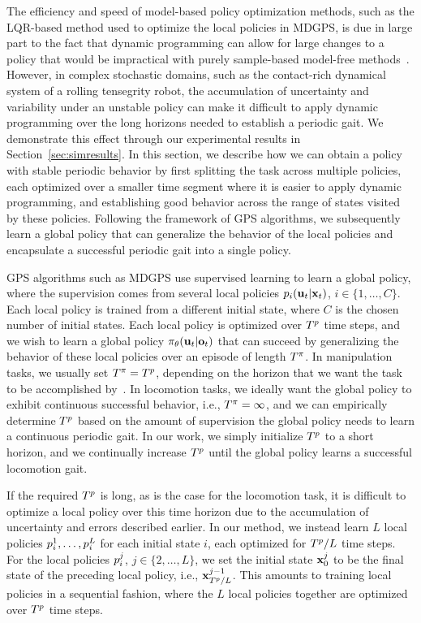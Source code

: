 The efficiency and speed of model-based policy optimization methods, such as the
LQR-based method used to optimize the local policies in MDGPS, is due in large
part to the fact that dynamic programming can allow for large changes to a
policy that would be impractical with purely sample-based model-free
methods~\cite{la-lnnpg-14}. However, in complex stochastic domains, such as the
contact-rich dynamical system of a rolling tensegrity robot, the accumulation of
uncertainty and variability under an unstable policy can make it difficult to
apply dynamic programming over the long horizons needed to establish a periodic
gait. We demonstrate this effect through our experimental results in
Section~\ref{sec:simresults}. In this section, we describe how we can obtain a
policy with stable periodic behavior by first splitting the task across multiple
policies, each optimized over a smaller time segment where it is easier to apply
dynamic programming, and establishing good behavior across the range of states
visited by these policies. Following the framework of GPS algorithms, we
subsequently learn a global policy that can generalize the behavior of the local
policies and encapsulate a successful periodic gait into a single policy.

GPS algorithms such as MDGPS use supervised learning to learn a global policy,
where the supervision comes from several local policies $p_i(\mathbf{u}_t|\mathbf{x}_t)$,
$i\in\{1,\ldots,C\}$. Each local policy is trained from a different initial
state, where $C$ is the chosen number of initial states. Each local policy is
optimized over $T^{p}$ time steps, and we wish to learn a global policy
$\pi_{\theta}(\mathbf{u}_t|\mathbf{o}_t)$ that can succeed by generalizing the behavior of
these local policies over an episode of length $T^{\pi}$. In manipulation
tasks, we usually set $T^{\pi}=T^{p}$, depending on the horizon that
we want the task to be accomplished by~\cite{lfda-eetdv-16}. In locomotion
tasks, we ideally want the global policy to exhibit continuous successful
behavior, i.e., $T^{\pi}=\infty$, and we can empirically determine
$T^{p}$ based on the amount of supervision the global policy needs to
learn a continuous periodic gait. In our work, we simply initialize
$T^{p}$ to a short horizon, and we continually increase $T^{p}$
until the global policy learns a successful locomotion gait.

If the required $T^{p}$ is long, as is the case for the \SB{} locomotion
task, it is difficult to optimize a local policy over this time horizon due to
the accumulation of uncertainty and errors described earlier. In our method, we
instead learn $L$ local policies $p_i^1,\ldots,p_i^L$ for each
initial state $i$, each optimized for $T^{p}/L$ time steps. For the
local policies $p_i^j$, $j\in\{2,\ldots,L\}$, we set the initial state
$\mathbf{x}_0^j$ to be the final state of the preceding local policy, i.e.,
$\mathbf{x}_{T^{p}/L}^{j-1}$. This amounts to training local policies in a
sequential fashion, where the $L$ local policies together are optimized over
$T^{p}$ time steps.

